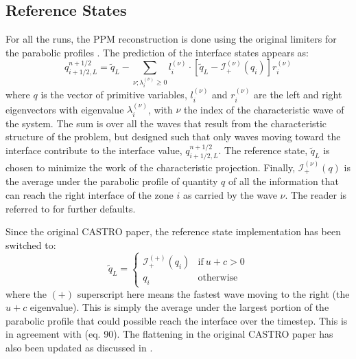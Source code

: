 \documentclass[iop]{emulateapj}
\begin{document}
\subsection{Reference States}

For all the runs, the PPM reconstruction is done using the original limiters for
the parabolic profiles \citep{ppm}.  The prediction of the interface
states appears as:
\begin{equation}
\label{eq:ppmstatel}
q_{i+1/2,L}^{n+1/2} = \tilde{q}_L -
   \sum_{\nu;\lambda_i^{(\nu)}\ge 0} l_i^{(\nu)} \cdot \left [
        \tilde{q}_L  - \mathcal{I}^{(\nu)}_+(q_i)
       \right ] r_i^{(\nu)}
\end{equation}
where $q$ is the vector of primitive variables, $l_i^{(\nu)}$ and
$r_i^{(\nu)}$ are the left and right eigenvectors with eigenvalue
$\lambda_i^{(\nu)}$, with $\nu$ the index of the characteristic wave of
the system.  The sum is over all the waves that result from the
characteristic structure of the problem, but designed such that only
waves moving toward the interface contribute to the interface value,
$q_{i+1/2,L}^{n+1/2}$.  The reference state, $\tilde{q}_L$ is
chosen to minimize the work of the characteristic projection.
Finally, $\mathcal{I}_+^{(\nu)}(q)$ is the
average under the parabolic profile of quantity $q$ of all the
information that can reach the right interface of the zone $i$ as
carried by the wave $\nu$.  The reader is referred to
\citet{ppmunsplit} for further defaults.

Since the original CASTRO paper, the reference state implementation
has been switched to:
\begin{equation}
\label{eq:refchoice}
\tilde{q}_L = \left \{ \begin{array}{cc}
       \mathcal{I}_+^{(+)}(q_i) & \mathrm{if~} u + c > 0 \\
       q_i                    & \mathrm{otherwise}
\end{array}
\right .
\end{equation}
where the $(+)$ superscript here means the fastest wave moving to the right
(the $u+c$ eigenvalue).   This is simply the average under the largest
portion of the parabolic profile that could possible reach the interface 
over the timestep.  This is
in agreement with \citet{ppmunsplit} (eq. 90).  The flattening
in the original CASTRO paper has also been updated as discussed
in \citet{zingalekatz:2015}.
\end{document}
